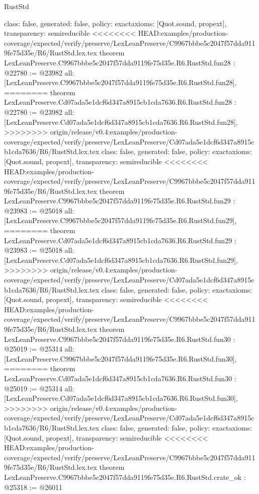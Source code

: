 \begin{lexlean}{RustStd}
\begin{coremodule}
{\begin{coremodule}
{{{{{{{{{{{{{{{{{{{{{{{{{{{{{{{  class: false,
  generated: false,
  policy: exact{axioms: [Quot.sound, propext]},
  transparency: semireducible
}
<<<<<<<< HEAD:examples/production-coverage/expected/verify/preserve/LexLeanPreserve/C9967bbbe5c2047f57dda9119fe75d35e/R6/RustStd.lex.tex
theorem LexLeanPreserve.C9967bbbe5c2047f57dda9119fe75d35e.R6.RustStd.fun28 : @22780 := @23982 {
  all: [LexLeanPreserve.C9967bbbe5c2047f57dda9119fe75d35e.R6.RustStd.fun28],
========
theorem LexLeanPreserve.Cd07ada5e1dcf6d347a8915cb1cda7636.R6.RustStd.fun28 : @22780 := @23982 {
  all: [LexLeanPreserve.Cd07ada5e1dcf6d347a8915cb1cda7636.R6.RustStd.fun28],
>>>>>>>> origin/release/v0.4:examples/production-coverage/expected/verify/preserve/LexLeanPreserve/Cd07ada5e1dcf6d347a8915cb1cda7636/R6/RustStd.lex.tex
  class: false,
  generated: false,
  policy: exact{axioms: [Quot.sound, propext]},
  transparency: semireducible
}
<<<<<<<< HEAD:examples/production-coverage/expected/verify/preserve/LexLeanPreserve/C9967bbbe5c2047f57dda9119fe75d35e/R6/RustStd.lex.tex
theorem LexLeanPreserve.C9967bbbe5c2047f57dda9119fe75d35e.R6.RustStd.fun29 : @23983 := @25018 {
  all: [LexLeanPreserve.C9967bbbe5c2047f57dda9119fe75d35e.R6.RustStd.fun29],
========
theorem LexLeanPreserve.Cd07ada5e1dcf6d347a8915cb1cda7636.R6.RustStd.fun29 : @23983 := @25018 {
  all: [LexLeanPreserve.Cd07ada5e1dcf6d347a8915cb1cda7636.R6.RustStd.fun29],
>>>>>>>> origin/release/v0.4:examples/production-coverage/expected/verify/preserve/LexLeanPreserve/Cd07ada5e1dcf6d347a8915cb1cda7636/R6/RustStd.lex.tex
  class: false,
  generated: false,
  policy: exact{axioms: [Quot.sound, propext]},
  transparency: semireducible
}
<<<<<<<< HEAD:examples/production-coverage/expected/verify/preserve/LexLeanPreserve/C9967bbbe5c2047f57dda9119fe75d35e/R6/RustStd.lex.tex
theorem LexLeanPreserve.C9967bbbe5c2047f57dda9119fe75d35e.R6.RustStd.fun30 : @25019 := @25314 {
  all: [LexLeanPreserve.C9967bbbe5c2047f57dda9119fe75d35e.R6.RustStd.fun30],
========
theorem LexLeanPreserve.Cd07ada5e1dcf6d347a8915cb1cda7636.R6.RustStd.fun30 : @25019 := @25314 {
  all: [LexLeanPreserve.Cd07ada5e1dcf6d347a8915cb1cda7636.R6.RustStd.fun30],
>>>>>>>> origin/release/v0.4:examples/production-coverage/expected/verify/preserve/LexLeanPreserve/Cd07ada5e1dcf6d347a8915cb1cda7636/R6/RustStd.lex.tex
  class: false,
  generated: false,
  policy: exact{axioms: [Quot.sound, propext]},
  transparency: semireducible
}
<<<<<<<< HEAD:examples/production-coverage/expected/verify/preserve/LexLeanPreserve/C9967bbbe5c2047f57dda9119fe75d35e/R6/RustStd.lex.tex
theorem LexLeanPreserve.C9967bbbe5c2047f57dda9119fe75d35e.R6.RustStd.crate_ok : @25318 := @26011 {
}}}}}}}}}}}}}}}}}}}}}}}}}}}}}}}}}}
\end{coremodule}}
\end{coremodule}
\end{lexlean}
